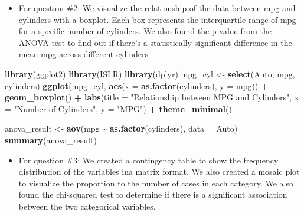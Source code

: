 \documentclass[
]{article}
\newenvironment{Shaded}{\begin{snugshade}}{\end{snugshade}}
\newcommand{\AttributeTok}[1]{\textcolor[rgb]{0.13,0.29,0.53}{#1}}
\newcommand{\FunctionTok}[1]{\textcolor[rgb]{0.13,0.29,0.53}{\textbf{#1}}}
\newcommand{\NormalTok}[1]{#1}
\newcommand{\OtherTok}[1]{\textcolor[rgb]{0.56,0.35,0.01}{#1}}
\newcommand{\SpecialCharTok}[1]{\textcolor[rgb]{0.81,0.36,0.00}{\textbf{#1}}}
\newcommand{\StringTok}[1]{\textcolor[rgb]{0.31,0.60,0.02}{#1}}
\providecommand{\tightlist}{%
  \setlength{\itemsep}{0pt}\setlength{\parskip}{0pt}}
\begin{document}
\begin{itemize}
\tightlist
\item
  For question \#2: We visualize the relationship of the data between
  mpg and cylinders with a boxplot. Each box represents the
  interquartile range of mpg for a specific number of cylinders. We also
  found the p-value from the ANOVA test to find out if there's a
  statistically significant difference in the mean mpg across different
  cylinders
\end{itemize}

\begin{Shaded}
\begin{Highlighting}[]
\FunctionTok{library}\NormalTok{(ggplot2)}
\FunctionTok{library}\NormalTok{(ISLR)}
\FunctionTok{library}\NormalTok{(dplyr)}
\NormalTok{mpg\_cyl }\OtherTok{\textless{}{-}} \FunctionTok{select}\NormalTok{(Auto, mpg, cylinders)}
\FunctionTok{ggplot}\NormalTok{(mpg\_cyl, }\FunctionTok{aes}\NormalTok{(}\AttributeTok{x =} \FunctionTok{as.factor}\NormalTok{(cylinders), }\AttributeTok{y =}\NormalTok{ mpg)) }\SpecialCharTok{+}
  \FunctionTok{geom\_boxplot}\NormalTok{() }\SpecialCharTok{+}
  \FunctionTok{labs}\NormalTok{(}\AttributeTok{title =} \StringTok{"Relationship between MPG and Cylinders"}\NormalTok{,}
       \AttributeTok{x =} \StringTok{"Number of Cylinders"}\NormalTok{,}
       \AttributeTok{y =} \StringTok{"MPG"}\NormalTok{) }\SpecialCharTok{+}
  \FunctionTok{theme\_minimal}\NormalTok{()}

\NormalTok{anova\_result }\OtherTok{\textless{}{-}} \FunctionTok{aov}\NormalTok{(mpg }\SpecialCharTok{\textasciitilde{}} \FunctionTok{as.factor}\NormalTok{(cylinders), }\AttributeTok{data =}\NormalTok{ Auto)}
\FunctionTok{summary}\NormalTok{(anova\_result)}
\end{Highlighting}
\end{Shaded}

\begin{itemize}
\tightlist
\item
  For question \#3: We created a contingency table to show the frequency
  distribution of the variables ina matrix format. We also created a
  mosaic plot to visualize the proportion to the number of cases in each
  category. We also found the chi-squared test to determine if there is
  a significant association between the two categorical variables.
\end{itemize}
\end{document}
